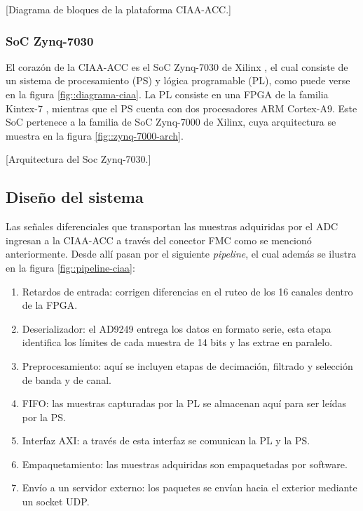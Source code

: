 \documentclass[../../main.tex]{subfiles}
\begin{document}

[Diagrama de bloques de la plataforma CIAA-ACC.]

\subsubsection{SoC Zynq-7030}
El corazón de la CIAA-ACC es el SoC Zynq-7030 de Xilinx \cite{SoC}, el cual consiste de un sistema de procesamiento (PS) y lógica programable (PL), como puede verse en la figura \ref{fig::diagrama-ciaa}. La PL consiste en una FPGA de la familia Kintex-7 \cite{Kintex-7}, mientras que el PS cuenta con dos procesadores ARM Cortex-A9. Este SoC pertenece a la familia de SoC Zynq-7000 de Xilinx, cuya arquitectura se muestra en la figura \ref{fig::zynq-7000-arch}.

[Arquitectura del Soc Zynq-7030.]

\subsection{Diseño del sistema}\label{subsec::disenio-sist-preproc}
Las señales diferenciales que transportan las muestras adquiridas por el ADC ingresan a la CIAA-ACC a través del conector FMC como se mencionó anteriormente. Desde allí pasan por el siguiente \textit{pipeline}, el cual además se ilustra en la figura \ref{fig::pipeline-ciaa}:

\begin{enumerate}
    \item Retardos de entrada: corrigen diferencias en el ruteo de los 16 canales dentro de la FPGA.
    \item Deserializador: el AD9249 entrega los datos en formato serie, esta etapa identifica los límites de cada muestra de 14 bits y las extrae en paralelo.
    \item Preprocesamiento: aquí se incluyen etapas de decimación, filtrado y selección de banda y de canal.
    \item FIFO: las muestras capturadas por la PL se almacenan aquí para ser leídas por la PS.
    \item Interfaz AXI: a través de esta interfaz se comunican la PL y la PS.
    \item Empaquetamiento: las muestras adquiridas son empaquetadas por software.
    \item Envío a un servidor externo: los paquetes se envían hacia el exterior mediante un socket UDP.
\end{enumerate}
\end{document}
